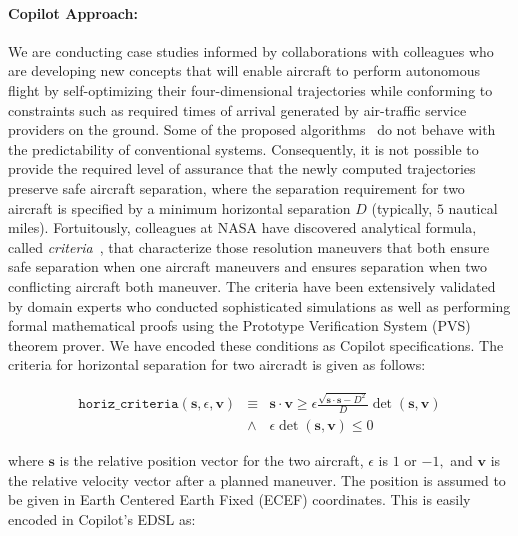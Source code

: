 \paragraph{Copilot Approach:} We are conducting case studies informed
by collaborations with colleagues who are developing new concepts that
will enable aircraft to perform autonomous flight by self-optimizing
their four-dimensional trajectories while conforming to constraints
such as required times of arrival generated by air-traffic service
providers on the ground. Some of the proposed
algorithms~\cite{KarrVRC} do not behave with the predictability of
conventional systems.  Consequently, it is not possible to provide the
required level of assurance that the newly computed trajectories
preserve safe aircraft separation, where the separation requirement
for two aircraft is specified by a minimum horizontal separation $D$
(typically, $5$ nautical miles).  Fortuitously, colleagues at NASA
have discovered analytical formula, called
\emph{criteria}~\cite{NM2011NASA}, that characterize those
resolution maneuvers that both ensure safe separation when one
aircraft maneuvers and ensures separation when two conflicting
aircraft both maneuver. The criteria have been extensively validated
by domain experts who conducted  sophisticated simulations as well as
performing formal mathematical proofs using the Prototype Verification
System (PVS) theorem prover. We have encoded these conditions as
Copilot specifications. The criteria for horizontal separation for two
aircradt is given as follows:

\begin{eqnarray*} \texttt{horiz\_criteria}(\bm{s}, \epsilon, \bm{v})
& \equiv &  \bm{s} \cdot \bm{v} \geq \epsilon  \frac{\sqrt{\bm{s} \cdot
  \bm{s}  - D^2}} {D} \operatorname{det}(\bm{s},\bm{v})  \\
& \wedge &  \epsilon \operatorname{det}(\bm{s},\bm{v})  \leq  0 
\end{eqnarray*}

\noindent 
where $\bm{s}$ is the relative position 
vector for the two aircraft, $\epsilon$ is $1$ or $-1,$  and 
$\bm{v}$ is the relative velocity vector after a planned maneuver. 
The position is  assumed to be given in Earth Centered Earth Fixed (ECEF)
coordinates.  This is easily encoded in  Copilot's EDSL as:

